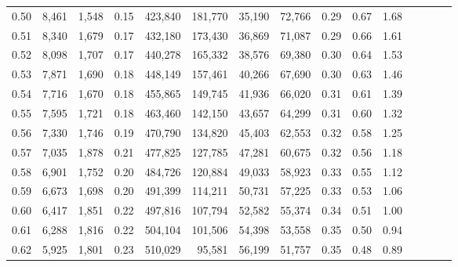 \begin{tabular}{rrrcrrrrrrrrrrr}
0.50 &   8,461 &  1,548 &                                       0.15 &  423,840 &  181,770 &   35,190 &   72,766 &  0.29 &  0.67 &                         1.68 \\
0.51 &   8,340 &  1,679 &                                       0.17 &  432,180 &  173,430 &   36,869 &   71,087 &  0.29 &  0.66 &                         1.61 \\
0.52 &   8,098 &  1,707 &                                       0.17 &  440,278 &  165,332 &   38,576 &   69,380 &  0.30 &  0.64 &                         1.53 \\
0.53 &   7,871 &  1,690 &                                       0.18 &  448,149 &  157,461 &   40,266 &   67,690 &  0.30 &  0.63 &                         1.46 \\
0.54 &   7,716 &  1,670 &                                       0.18 &  455,865 &  149,745 &   41,936 &   66,020 &  0.31 &  0.61 &                         1.39 \\
0.55 &   7,595 &  1,721 &                                       0.18 &  463,460 &  142,150 &   43,657 &   64,299 &  0.31 &  0.60 &                         1.32 \\
0.56 &   7,330 &  1,746 &                                       0.19 &  470,790 &  134,820 &   45,403 &   62,553 &  0.32 &  0.58 &                         1.25 \\
0.57 &   7,035 &  1,878 &                                       0.21 &  477,825 &  127,785 &   47,281 &   60,675 &  0.32 &  0.56 &                         1.18 \\
0.58 &   6,901 &  1,752 &                                       0.20 &  484,726 &  120,884 &   49,033 &   58,923 &  0.33 &  0.55 &                         1.12 \\
0.59 &   6,673 &  1,698 &                                       0.20 &  491,399 &  114,211 &   50,731 &   57,225 &  0.33 &  0.53 &                         1.06 \\
0.60 &   6,417 &  1,851 &                                       0.22 &  497,816 &  107,794 &   52,582 &   55,374 &  0.34 &  0.51 &                         1.00 \\
0.61 &   6,288 &  1,816 &                                       0.22 &  504,104 &  101,506 &   54,398 &   53,558 &  0.35 &  0.50 &                         0.94 \\
0.62 &   5,925 &  1,801 &                                       0.23 &  510,029 &   95,581 &   56,199 &   51,757 &  0.35 &  0.48 &                         0.89 \\

\end{tabular}
